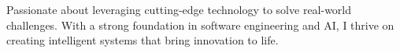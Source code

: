 


\begin{cvparagraph}
Passionate about leveraging cutting-edge technology to solve real-world challenges. With a strong foundation in software engineering and AI, I thrive on creating intelligent systems that bring innovation to life.
\end{cvparagraph}
